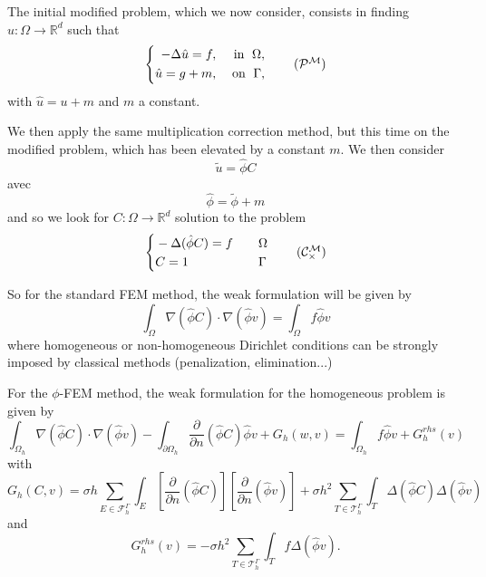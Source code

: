 The initial modified problem, which we now consider, consists in finding $u : \Omega \rightarrow \mathbb{R}^d$ such that
\begin{equation}
	\label{eq.corr.pb_reh}
	\left\{
	\begin{aligned}
		-\Delta \hat{u} = f, \; &&\text{in } \; \Omega, \\
		\hat{u}=g+m, \; &&\text{on } \; \Gamma,
	\end{aligned}
	\right. \tag{$\mathcal{P}^\mathcal{M}$}
\end{equation}
with $\hat{u}=u+m$ and $m$ a constant.


We then apply the same multiplication correction method, but this time on the modified problem, which has been elevated by a constant $m$. We then consider
\begin{equation*}
	\tilde{u}=\hat{\phi}C
\end{equation*}
avec 
\begin{equation*}
	\hat{\phi}=\tilde{\phi}+m
\end{equation*}
and so we look for $C: \Omega \rightarrow \mathbb{R}^d$ solution to the problem
\begin{equation}
	\label{eq.corr.pbc_mult_reh}
	\left\{\begin{aligned}
		&-\Delta (\hat{\phi}C)=f \quad &&\Omega \\
		&C=1 \quad &&\Gamma
	\end{aligned}\right. \tag{$\mathcal{C}_\times^\mathcal{M}$}
\end{equation}

So for the standard FEM method, the weak formulation will be given by
\begin{equation*}
	\int_\Omega \nabla (\hat{\phi}C)\cdot\nabla (\hat{\phi}v)=\int_\Omega f\hat{\phi}v
\end{equation*}
where homogeneous or non-homogeneous Dirichlet conditions can be strongly imposed by classical methods (penalization, elimination...)

For the $\phi$-FEM method, the weak formulation for the homogeneous problem is given by
\begin{equation*}
	\int_{\Omega_h} \nabla (\hat{\phi} C) \cdot \nabla (\hat{\phi} v) - \int_{\partial\Omega_h} \frac{\partial}{\partial n}(\hat{\phi} C)\hat{\phi} v+G_h(w,v)=\int_{\Omega_h} f \hat{\phi} v + G_h^{rhs}(v)
\end{equation*}
with
\begin{equation*}
	G_h(C,v)=\sigma h\sum_{E\in\mathcal{F}_h^\Gamma} \int_E \left[\frac{\partial}{\partial n}(\hat{\phi} C)\right] \left[\frac{\partial}{\partial n}(\hat{\phi} v)\right]+\sigma h^2\sum_{T\in\mathcal{T}_h^\Gamma} \int_{T} \Delta(\hat{\phi} C)\Delta(\hat{\phi} v)
\end{equation*}
and
\begin{equation*}
	G_h^{rhs}(v)=-\sigma h^2\sum_{T\in\mathcal{T}_h^\Gamma} \int_{T} f \Delta(\hat{\phi} v).
\end{equation*}

